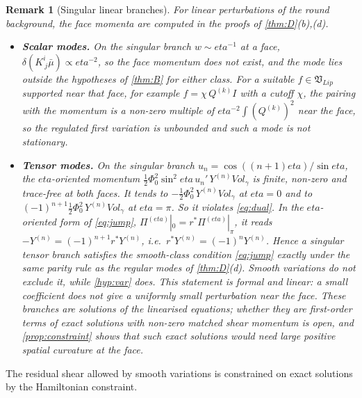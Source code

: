 \documentclass[11pt]{article}
\theoremstyle{canonmath}
\newtheorem{remark}[theorem]{Remark}
\theoremstyle{canonpostulate}
\theoremstyle{canonproposition}
\theoremstyle{canonmath}
\theoremstyle{canonproposition}
\providecommand{\Vlip}{\mathfrak{V}_{\mathrm{Lip}}}
\def\mathrm#1{#1}%
\def\eta{eta}%
\begin{document}
\begin{remark}[Singular linear branches]\label{rem:singbranch}
For linear perturbations of the round background, the face momenta are computed in the proofs of \cref{thm:D}(b),(d).
\begin{itemize}
\item \textbf{Scalar modes.} On the singular branch $w\sim\eta^{-1}$ at a face, $\delta(K^i_{\ j}\bar\mu)\propto\eta^{-2}$, so the face momentum does not exist, and the mode lies outside the hypotheses of \cref{thm:B} for either class. For a suitable $f\in\Vlip$ supported near that face, for example $f = \chi\,Q^{(k)}I$ with a cutoff $\chi$, the pairing with the momentum is a non-zero multiple of $\eta^{-2}\int(Q^{(k)})^2$ near the face, so the regulated first variation is unbounded and such a mode is not stationary.
\item \textbf{Tensor modes.} On the singular branch $u_n = \cos((n+1)\eta)/\sin\eta$, the $\eta$-oriented momentum $\tfrac12\Phi_0^2\sin^2\eta\,u_n'\,Y^{(n)}\mathrm{Vol}_\gamma$ is finite, non-zero and trace-free at both faces. It tends to $-\tfrac12\Phi_0^2\,Y^{(n)}\mathrm{Vol}_\gamma$ at $\eta = 0$ and to $(-1)^{n+1}\tfrac12\Phi_0^2\,Y^{(n)}\mathrm{Vol}_\gamma$ at $\eta = \pi$. So it violates \eqref{eq:dual}. In the $\eta$-oriented form of \eqref{eq:jump}, $\Pi^{(\eta)}|_{0} = r^*\Pi^{(\eta)}|_{\pi}$, it reads $-Y^{(n)} = (-1)^{n+1}r^*Y^{(n)}$, i.e.\ $r^*Y^{(n)} = (-1)^nY^{(n)}$. Hence a singular tensor branch satisfies the smooth-class condition \eqref{eq:jump} exactly under the same parity rule as the regular modes of \cref{thm:D}(d). Smooth variations do not exclude it, while \ref{hyp:var} does. This statement is formal and linear: a small coefficient does not give a uniformly small perturbation near the face. These branches are solutions of the linearised equations; whether they are first-order terms of exact solutions with non-zero matched shear momentum is open, and \cref{prop:constraint} shows that such exact solutions would need large positive spatial curvature at the face.
\end{itemize}
\end{remark}

The residual shear allowed by smooth variations is constrained on exact solutions by the Hamiltonian constraint.
\end{document}
